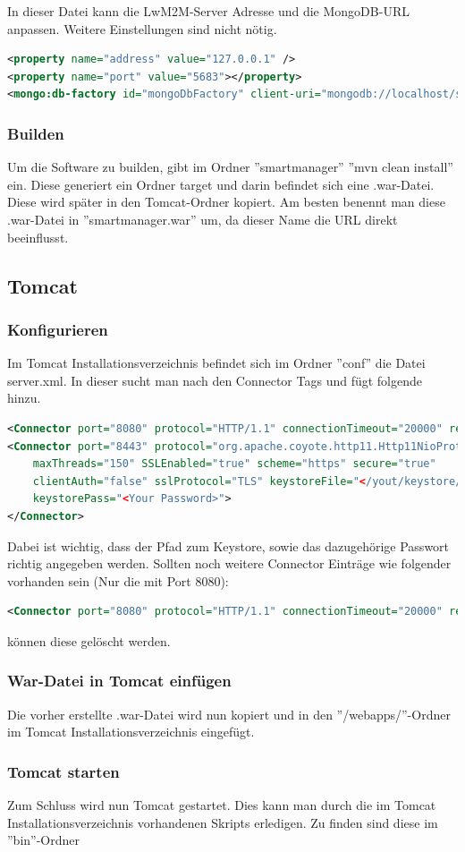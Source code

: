 In dieser Datei kann die LwM2M-Server Adresse und die MongoDB-URL anpassen. Weitere Einstellungen sind nicht nötig.
\begin{lstlisting}[language=xml]
<property name="address" value="127.0.0.1" />
<property name="port" value="5683"></property>
<mongo:db-factory id="mongoDbFactory" client-uri="mongodb://localhost/smartmanager" />
\end{lstlisting}

\subsubsection{Builden}
Um die Software zu builden, gibt im Ordner ''smartmanager'' ''mvn clean install'' ein. Diese generiert ein Ordner target und darin befindet sich eine .war-Datei. Diese wird später in den Tomcat-Ordner kopiert. Am besten benennt man diese .war-Datei in ''smartmanager.war'' um, da dieser Name die URL direkt beeinflusst.

\subsection{Tomcat}
\subsubsection{Konfigurieren}
Im Tomcat Installationsverzeichnis befindet sich im Ordner ''conf'' die Datei server.xml. In dieser sucht man nach den Connector Tags und fügt folgende hinzu.
\begin{lstlisting}[language=xml]
<Connector port="8080" protocol="HTTP/1.1" connectionTimeout="20000" redirectPort="8443" />
<Connector port="8443" protocol="org.apache.coyote.http11.Http11NioProtocol"
	maxThreads="150" SSLEnabled="true" scheme="https" secure="true"
	clientAuth="false" sslProtocol="TLS" keystoreFile="</yout/keystore/path/.keystore>"
	keystorePass="<Your Password>">
</Connector>
\end{lstlisting}

Dabei ist wichtig, dass der Pfad zum Keystore, sowie das dazugehörige Passwort richtig angegeben werden.
Sollten noch weitere Connector Einträge wie folgender vorhanden sein (Nur die mit Port 8080):
\begin{lstlisting}[language=xml]
<Connector port="8080" protocol="HTTP/1.1" connectionTimeout="20000" redirectPort="8443" />
\end{lstlisting}
können diese gelöscht werden.
\subsubsection{War-Datei in Tomcat einfügen}
Die vorher erstellte .war-Datei wird nun kopiert und in den ''/webapps/''-Ordner im Tomcat Installationsverzeichnis eingefügt.
\subsubsection{Tomcat starten}
Zum Schluss wird nun Tomcat gestartet. Dies kann man durch die im Tomcat Installationsverzeichnis vorhandenen Skripts erledigen. Zu finden sind diese im ''bin''-Ordner
